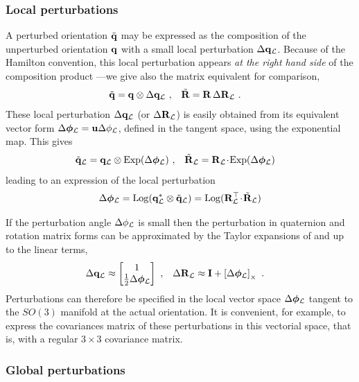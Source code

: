 \subsubsection{Local perturbations}

A perturbed orientation $\tilde{{\bf q}}$ may be expressed as the composition of the unperturbed orientation ${\bf q}$ with a small local perturbation ${\Delta{\bf q}_{\mathcal{L}}}$. 
Because of the Hamilton convention, this local perturbation appears \emph{at the right hand side} of the composition product ---we give also the matrix equivalent for comparison,
%
\begin{align}
\tilde{{\bf q}} &= {\bf q}\otimes{\Delta{\bf q}_{\mathcal{L}}}
~, &
\tilde{{\bf R}} &= {\bf R}\,\Delta{\bf R}_{\mathcal{L}}
~.
\end{align}%
%
These local perturbation $\Delta{\bf q}_{\mathcal{L}}$ (or $\Delta{\bf R}_{\mathcal{L}}$) is easily obtained from its equivalent vector form $\Delta{\bm \phi}_{\mathcal{L}}={\bf u}\Delta\phi_{\mathcal{L}}$, defined in the tangent space, using the exponential map. This gives
%
\begin{align}
\tilde{{\bf q}}_{\mathcal{L}} &= {\bf q}_{\mathcal{L}}\otimes\operatorname*{Exp}(\Delta{\bm \phi}_{\mathcal{L}})
~,& 
\tilde{{\bf R}}_{\mathcal{L}} &= {\bf R}_{\mathcal{L}}\!\cdot\!\operatorname*{Exp}(\Delta{\bm \phi}_{\mathcal{L}})
\end{align}
%
leading to an expression of the local perturbation 
%
\begin{align}
\Delta{\bm \phi}_{\mathcal{L}} = \operatorname*{Log}({\bf q}_{\mathcal{L}}^*\otimes\tilde{{\bf q}}_{\mathcal{L}}) = \operatorname*{Log}({\bf R}_{\mathcal{L}}^{\top}\!\cdot\!\tilde{{\bf R}}_{\mathcal{L}})
\end{align}
 

If the perturbation angle $\Delta\phi_{\mathcal{L}}$ is small then the perturbation in quaternion and rotation matrix forms can be approximated by the Taylor expansions of  and  up to the linear terms,
%
\begin{align}
{\Delta{\bf q}_{\mathcal{L}}}& \approx \begin{bmatrix}
1\\\frac{1}{2}\Delta{\bm \phi}_{\mathcal{L}}
\end{bmatrix}
~,
&
\Delta{\bf R}_{\mathcal{L}}& \approx
{\bf I}+\left[\Delta{\bm \phi}_{\mathcal{L}}\right]_\times
~.
\end{align}%
%
Perturbations can therefore be specified in the local vector space $\Delta{\bm \phi}_{\mathcal{L}}$ tangent to the $SO(3)$ manifold at the actual orientation. It is convenient, for example, to express the covariances matrix of these perturbations in this vectorial space, that is, with a regular $3\times 3$ covariance matrix.

\subsubsection{Global perturbations}

